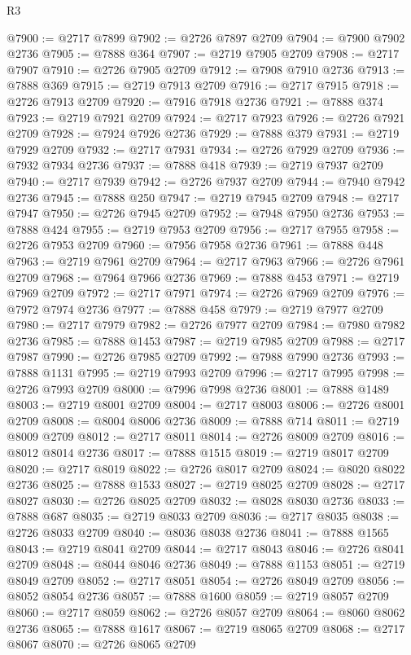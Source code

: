 \begin{lexlean}{R3}
\begin{coremodule}
@7900 := @2717 @7899
@7902 := @2726 @7897 @2709
@7904 := @7900 @7902 @2736
@7905 := @7888 @364
@7907 := @2719 @7905 @2709
@7908 := @2717 @7907
@7910 := @2726 @7905 @2709
@7912 := @7908 @7910 @2736
@7913 := @7888 @369
@7915 := @2719 @7913 @2709
@7916 := @2717 @7915
@7918 := @2726 @7913 @2709
@7920 := @7916 @7918 @2736
@7921 := @7888 @374
@7923 := @2719 @7921 @2709
@7924 := @2717 @7923
@7926 := @2726 @7921 @2709
@7928 := @7924 @7926 @2736
@7929 := @7888 @379
@7931 := @2719 @7929 @2709
@7932 := @2717 @7931
@7934 := @2726 @7929 @2709
@7936 := @7932 @7934 @2736
@7937 := @7888 @418
@7939 := @2719 @7937 @2709
@7940 := @2717 @7939
@7942 := @2726 @7937 @2709
@7944 := @7940 @7942 @2736
@7945 := @7888 @250
@7947 := @2719 @7945 @2709
@7948 := @2717 @7947
@7950 := @2726 @7945 @2709
@7952 := @7948 @7950 @2736
@7953 := @7888 @424
@7955 := @2719 @7953 @2709
@7956 := @2717 @7955
@7958 := @2726 @7953 @2709
@7960 := @7956 @7958 @2736
@7961 := @7888 @448
@7963 := @2719 @7961 @2709
@7964 := @2717 @7963
@7966 := @2726 @7961 @2709
@7968 := @7964 @7966 @2736
@7969 := @7888 @453
@7971 := @2719 @7969 @2709
@7972 := @2717 @7971
@7974 := @2726 @7969 @2709
@7976 := @7972 @7974 @2736
@7977 := @7888 @458
@7979 := @2719 @7977 @2709
@7980 := @2717 @7979
@7982 := @2726 @7977 @2709
@7984 := @7980 @7982 @2736
@7985 := @7888 @1453
@7987 := @2719 @7985 @2709
@7988 := @2717 @7987
@7990 := @2726 @7985 @2709
@7992 := @7988 @7990 @2736
@7993 := @7888 @1131
@7995 := @2719 @7993 @2709
@7996 := @2717 @7995
@7998 := @2726 @7993 @2709
@8000 := @7996 @7998 @2736
@8001 := @7888 @1489
@8003 := @2719 @8001 @2709
@8004 := @2717 @8003
@8006 := @2726 @8001 @2709
@8008 := @8004 @8006 @2736
@8009 := @7888 @714
@8011 := @2719 @8009 @2709
@8012 := @2717 @8011
@8014 := @2726 @8009 @2709
@8016 := @8012 @8014 @2736
@8017 := @7888 @1515
@8019 := @2719 @8017 @2709
@8020 := @2717 @8019
@8022 := @2726 @8017 @2709
@8024 := @8020 @8022 @2736
@8025 := @7888 @1533
@8027 := @2719 @8025 @2709
@8028 := @2717 @8027
@8030 := @2726 @8025 @2709
@8032 := @8028 @8030 @2736
@8033 := @7888 @687
@8035 := @2719 @8033 @2709
@8036 := @2717 @8035
@8038 := @2726 @8033 @2709
@8040 := @8036 @8038 @2736
@8041 := @7888 @1565
@8043 := @2719 @8041 @2709
@8044 := @2717 @8043
@8046 := @2726 @8041 @2709
@8048 := @8044 @8046 @2736
@8049 := @7888 @1153
@8051 := @2719 @8049 @2709
@8052 := @2717 @8051
@8054 := @2726 @8049 @2709
@8056 := @8052 @8054 @2736
@8057 := @7888 @1600
@8059 := @2719 @8057 @2709
@8060 := @2717 @8059
@8062 := @2726 @8057 @2709
@8064 := @8060 @8062 @2736
@8065 := @7888 @1617
@8067 := @2719 @8065 @2709
@8068 := @2717 @8067
@8070 := @2726 @8065 @2709

\end{coremodule}
\end{lexlean}
